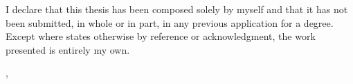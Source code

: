 \thispagestyle{empty}
\vspace*{0.76\textheight}
\noindent
I declare that this thesis has been composed solely by myself and that it has not been submitted, in whole or in part, in any previous application for a degree. Except where states otherwise by reference or acknowledgment, the work presented is entirely my own.

\vspace{15mm}
\noindent
\getSubmissionLocation{}, \getSubmissionDate{} \hspace{50mm} \getAuthor{}

\cleardoublepage{}
